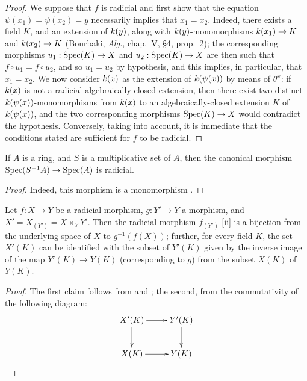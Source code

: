 \begin{proof}
We suppose that $f$ is radicial and first show that the equation $\psi(x_1)=\psi(x_2)=y$ necessarily implies that $x_1=x_2$.
Indeed, there exists a field $K$, and an extension of $k(y)$, along with $k(y)$-monomorphisms $\kres(x_1)\to K$ and $\kres(x_2)\to K$ (Bourbaki, \emph{Alg.}, chap.~V, §4, prop.~2); the corresponding morphisms $u_1:\Spec(K)\to X$ and $u_2:\Spec(K)\to X$ are then such that $f\circ u_1=f\circ u_2$, and so $u_1=u_2$ by hypothesis, and this implies, in particular, that $x_1=x_2$.
We now consider $k(x)$ as the extension of $k(\psi(x))$ by means of $\theta^x$: if $k(x)$ is not a radicial algebraically-closed extension, then there exist two distinct $k(\psi(x))$-monomorphisms from $k(x)$ to an algebraically-closed extension $K$ of $k(\psi(x))$, and the two corresponding morphisms $\Spec(K)\to X$ would contradict the hypothesis.
Conversely, taking  into account, it is immediate that the conditions stated are sufficient for $f$ to be radicial.
\end{proof}

\begin{corollary}[3.5.9]
\label{I.3.5.9}
If $A$ is a ring, and $S$ is a multiplicative set of $A$, then the canonical morphism $\Spec(S^{-1}A)\to\Spec(A)$ is radicial.
\end{corollary}

\begin{proof}
Indeed, this morphism is a monomorphism .
\end{proof}

\begin{corollary}[3.5.10]
\label{I.3.5.10}
Let $f:X\to Y$ be a radicial morphism, $g:Y'\to Y$ a morphism, and $X'=X_{(Y')}=X\times_Y Y'$.
Then the radicial morphism $f_{(Y')}$ [ii] is a bijection from the underlying space of $X$ to $g^{-1}(f(X))$; further, for every field $K$, the set $X'(K)$ can be identified with the subset of $Y'(K)$ given by the inverse image of the map $Y'(K)\to Y(K)$ (corresponding to $g$) from the subset $X(K)$ of $Y(K)$.
\end{corollary}

\begin{proof}
The first claim follows from  and ; the second, from the commutativity of the following diagram:
\[
  \xymatrix{
    X'(K)\ar[r]\ar[d] &
    Y'(K)\ar[d]\\
    X(K)\ar[r] &
    Y(K)
  }
\]
\end{proof}

